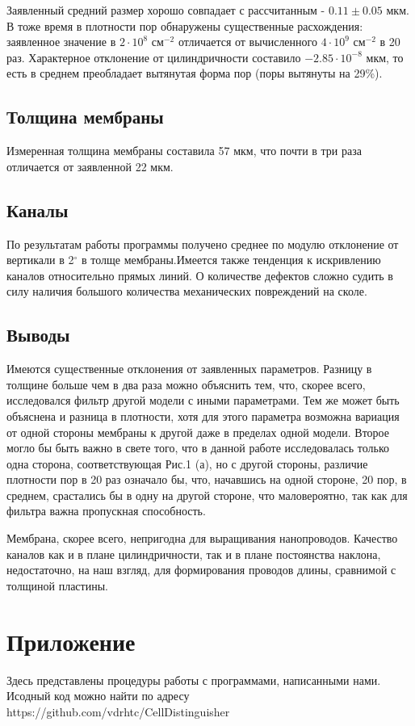 \documentclass[twocolumn,10pt,russian]{/usr/lib/python3.3/site-packages/sphinx/texinputs/sphinxhowto}
\begin{document}
Заявленный средний размер хорошо совпадает с рассчитанным -
$0.11 \pm 0.05$ мкм. В тоже время в плотности пор обнаружены
существенные расхождения: заявленное значение в $2\cdot 10^8$ см$^{-2}$
отличается от вычисленного $4\cdot 10^9$ см$^{-2}$ в 20 раз. Характерное
отклонение от цилиндричности составило $-2.85\cdot 10^{-8}$ мкм, то есть
в среднем преобладает вытянутая форма пор (поры вытянуты на 29\%).


\subsection{Толщина мембраны}
Измеренная толщина мембраны составила 57 мкм, что почти в три раза
отличается от заявленной 22 мкм.
\subsection{Каналы}
По результатам работы программы получено среднее по модулю отклонение от
вертикали в 2$^\circ$ в толще мембраны.Имеется также тенденция к
искривлению каналов относительно прямых линий. О количестве дефектов
сложно судить в силу наличия большого количества механических
повреждений на сколе.
\subsection{Выводы}
Имеются существенные отклонения от заявленных параметров. Разницу в толщине больше чем в два раза можно объяснить тем, что, скорее всего, исследовался фильтр другой модели с иными параметрами. Тем же может быть объяснена и разница в плотности, хотя для этого параметра возможна вариация от одной стороны мембраны к другой даже в пределах одной модели. Второе могло бы быть важно в свете того, что в данной работе исследовалась только одна сторона, соответствующая Рис.1 (а), но с другой стороны, различие плотности пор в 20 раз означало бы, что, начавшись на одной стороне, 20 пор, в среднем, срастались бы в одну на другой стороне, что маловероятно, так как для фильтра важна пропускная способность.

Мембрана, скорее всего, непригодна для выращивания нанопроводов.
Качество каналов как и в плане цилиндричности, так и в плане постоянства
наклона, недостаточно, на наш взгляд, для формирования проводов длины,
сравнимой с толщиной пластины.
\section{Приложение}
Здесь представлены процедуры работы с программами, написанными нами. Исодный код можно найти по адресу https://github.com/vdrhtc/CellDistinguisher
\end{document}
